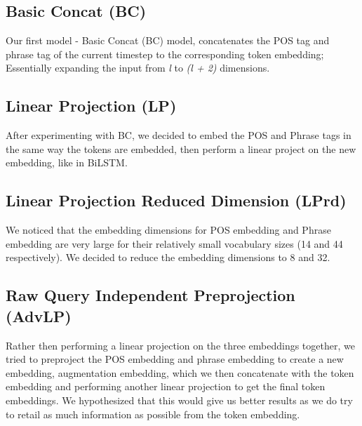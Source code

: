\documentclass{IEEEtran}
\begin{document}
      \subsection{Basic Concat (BC)}
      Our first model - Basic Concat (BC) model, concatenates the POS tag and phrase tag of the 
      current timestep to the corresponding token embedding; Essentially expanding the input
      from \textit{l} to \textit{(l + 2)} dimensions.

      \subsection{Linear Projection (LP)}
      After experimenting with BC, we decided to embed the POS and Phrase tags in the same way the
      tokens are embedded, then perform a linear project on the new embedding, like in BiLSTM.

      \subsection{Linear Projection Reduced Dimension (LPrd)}
      We noticed that the embedding dimensions for POS embedding and Phrase embedding are very
      large for their relatively small vocabulary sizes (14 and 44 respectively). We decided to 
      reduce the embedding dimensions to 8 and 32.

      \subsection{Raw Query Independent Preprojection (AdvLP)}
      Rather then performing a linear projection on the three embeddings together, we tried to 
      preproject the POS embedding and phrase embedding to create a new embedding, augmentation
      embedding, which we then concatenate with the token embedding and performing another
      linear projection to get the final token embeddings. We hypothesized that this would 
      give us better results as we do try to retail as much information as possible from the
      token embedding. 
\end{document}
